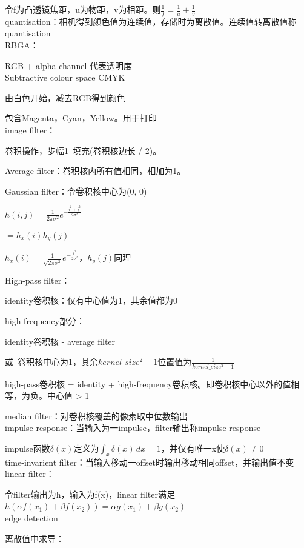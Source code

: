 \documentclass[UTF8]{ctexart}
\begin{document}
  令f为凸透镜焦距，u为物距，v为相距。则$\frac{1}{f} = \frac{1}{u} + \frac{1}{v}$\\
quantisation：相机得到颜色值为连续值，存储时为离散值。连续值转离散值称quantisation\\
RBGA：

  RGB + alpha channel 代表透明度\\
Subtractive colour space CMYK

  由白色开始，减去RGB得到颜色

  包含Magenta，Cyan，Yellow。用于打印\\
image filter：

  卷积操作，步幅1\ 填充(卷积核边长 / 2)。
  
  Average filter：卷积核内所有值相同，相加为1。

  Gaussian filter：令卷积核中心为(0, 0)

  \quad $h(i, j) = \frac{1}{2\pi\sigma^2}e^{-\frac{i^2+j^2}{2\sigma^2}}$

  \quad \quad $ = h_x(i) h_y(j)$

  \quad \quad $h_x(i) = \frac{1}{\sqrt{2\pi\sigma^2}}e^{-\frac{i^2}{2\sigma^2}}$，$h_y(j)$同理
  
  High-pass filter：

  \quad identity卷积核：仅有中心值为1，其余值都为0

  \quad high-frequency部分：
  
  \quad \quad identity卷积核 - average filter

  \quad \quad 或\ 卷积核中心为1，其余$kernel\_size^2 - 1$位置值为$\frac{1}{kernel\_size^2 - 1}$

  \quad high-pass卷积核 = identity + high-frequency卷积核。即卷积核中心以外的值相等，为负。中心值 > 1

  median filter：对卷积核覆盖的像素取中位数输出\\
impulse response：当输入为一impulse，filter输出称impulse response 

  impulse函数$\delta(x)$定义为$\int_x \delta(x) \,dx = 1$，并仅有唯一x使$\delta(x) \neq 0$\\
time-invarient filter：当输入移动一offset时输出移动相同offset，并输出值不变\\
linear filter：

  令filter输出为h，输入为f(x)，linear filter满足$h(\alpha f(x_1) + \beta f(x_2)) = \alpha g(x_1) + \beta g(x_2)$\\
edge detection

  离散值中求导：
  
\end{document}
